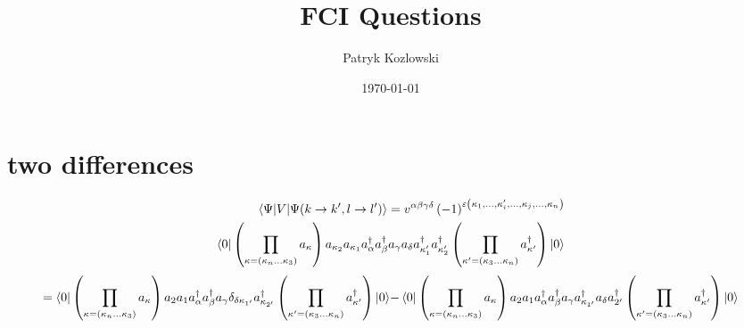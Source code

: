 \documentclass[12pt]{article}
\title{FCI Questions}
\author{Patryk Kozlowski}
\date{\today}
\begin{document}
\maketitle
\section{two differences}

\begin{subequations}
    \begin{align}
        \mel{\Psi }{V}{\Psi (k\rightarrow k^{\prime}, l\rightarrow l^{\prime})}
    =v^{\alpha\beta\gamma\delta}\left(-1\right)^{\varepsilon\left(\kappa_{1},\dots,\kappa_{i}^{\prime},\dots,\kappa _{j},...,\kappa_{n}\right)}\\
    \bra{0}\left(\prod_{\kappa=\left(\kappa_{n}\dots\kappa_{3}\right)}a_{\kappa}\right)
        a_{\kappa _{2}}a_{\kappa _{1}}a^{\dag}_{\alpha }a^{\dag}_{\beta }a_{\gamma }a_{\delta }a^{\dag}_{\kappa ^{\prime}_{1}}a^{\dag}_{\kappa _{2}^{\prime}}
    \left(\prod_{\kappa^{\prime}=\left(\kappa_{3}\dots\kappa_{n}\right)}a^{\dag}_{\kappa^{\prime}}\right)\ket{0}
    \end{align}
\end{subequations}
\begin{subequations}
    \begin{align}
        =\bra{0}\left(\prod_{\kappa=\left(\kappa_{n}\dots\kappa_{3}\right)}a_{\kappa}\right)
            a_{2}a_{1}a^{\dag}_{\alpha }a^{\dag}_{\beta }a_{\gamma }\delta _{\delta  \kappa _{1^{\prime}}}a^{\dag}_{\kappa _{2^{\prime}}}
        \left(\prod_{\kappa^{\prime}=\left(\kappa_{3}\dots\kappa_{n}\right)}a^{\dag}_{\kappa^{\prime}}\right)\ket{0}
    \end{align}
    \begin{align}
        -\bra{0}\left(\prod_{\kappa=\left(\kappa_{n}\dots\kappa_{3}\right)}a_{\kappa}\right)
            a_{2}a_{1}a^{\dag}_{\alpha }a^{\dag}_{\beta }a_{\gamma }a^{\dag}_{\kappa _{1^{\prime}}}a_{\delta }a^{\dag}_{2^{\prime}}
        \left(\prod_{\kappa^{\prime}=\left(\kappa_{3}\dots\kappa_{n}\right)}a^{\dag}_{\kappa^{\prime}}\right)\ket{0}
    \end{align}
    
\end{subequations}
\end{document}
